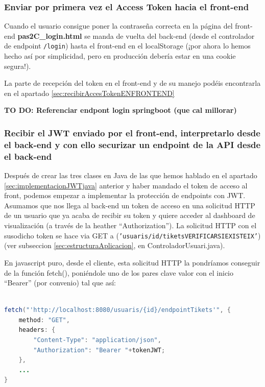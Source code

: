 \documentclass[a4paper,12pt]{report}
\begin{document}
		\subsubsection{Enviar por primera vez el Access Token hacia el front-end}
		\label{sec:enviarPorPrimeraVezAccesTokenDESDEBACKEND}
		
		Cuando el usuario consigue poner la contraseña correcta en la página del front-end \textbf{pas2C\_login.html} se manda de vuelta del back-end (desde el controlador de endpoint \texttt{/login}) hasta el front-end en el localStorage (¡por ahora lo hemos hecho así por simplicidad, pero en producción debería estar en una cookie segura!).
		
		La parte de recepción del token en el front-end y de su manejo podéis encontrarla en el apartado \ref{sec:recibirAccesTokenENFRONTEND}

		
		
		
		
		
		
		\textbf{TO DO: Referenciar endpont login springboot (que cal millorar)}
		
		\subsubsection{Recibir el JWT enviado por el front-end, interpretarlo desde el back-end y con ello securizar un endpoint de la API desde el back-end}
		
		Después de crear las tres clases en Java de las que hemos hablado en el apartado \ref{sec:implementacionJWTjava} anterior y haber mandado el token de acceso al front, podemos empezar a 
		implementar la protección de endpoints con JWT. Asumamos que nos llega al back-end un token de acceso en una solicitud HTTP de un usuario que ya acaba de recibir su token y quiere acceder al dashboard de visualización (a través de la heather ``Authorization''). La solicitud HTTP con el susodicho token se hace via GET a (\texttt{'usuaris/{id}/tiketsVERIFICARSIEXISTEIX'}) (ver subseccion \ref{sec:estructuraAplicacion}, en ControladorUsuari.java). 
		
		En javascript puro, desde el cliente, esta solicitud HTTP la pondríamos conseguir de la función fetch(), poniéndole uno de los pares clave valor con el inicio ``Bearer'' (por convenio) tal que así:
		
				
\begin{lstlisting}[language=Java, basicstyle=\ttfamily\footnotesize, keywordstyle=\color{magenta}]

fetch("'http://localhost:8080/usuaris/{id}/endpointTikets'", {
	method: "GET",
	headers: {
		"Content-Type": "application/json",
		"Authorization": "Bearer "+tokenJWT;
	},
	...
}
\end{lstlisting}
		
\end{document}
